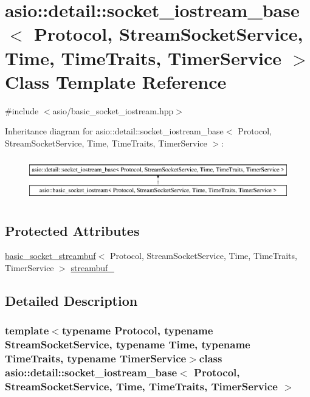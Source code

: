 \hypertarget{classasio_1_1detail_1_1socket__iostream__base}{}\section{asio\+:\+:detail\+:\+:socket\+\_\+iostream\+\_\+base$<$ Protocol, Stream\+Socket\+Service, Time, Time\+Traits, Timer\+Service $>$ Class Template Reference}
\label{classasio_1_1detail_1_1socket__iostream__base}


{\ttfamily \#include $<$asio/basic\+\_\+socket\+\_\+iostream.\+hpp$>$}

Inheritance diagram for asio\+:\+:detail\+:\+:socket\+\_\+iostream\+\_\+base$<$ Protocol, Stream\+Socket\+Service, Time, Time\+Traits, Timer\+Service $>$\+:\begin{figure}[H]
\begin{center}
\leavevmode
\includegraphics[height=1.882353cm]{classasio_1_1detail_1_1socket__iostream__base}
\end{center}
\end{figure}
\subsection*{Protected Attributes}
\begin{DoxyCompactItemize}
\item 
\hyperlink{classasio_1_1basic__socket__streambuf}{basic\+\_\+socket\+\_\+streambuf}$<$ Protocol, Stream\+Socket\+Service, Time, Time\+Traits, Timer\+Service $>$ \hyperlink{classasio_1_1detail_1_1socket__iostream__base_ac5d4983a9fb3035497092a1de10616d6}{streambuf\+\_\+}
\end{DoxyCompactItemize}


\subsection{Detailed Description}
\subsubsection*{template$<$typename Protocol, typename Stream\+Socket\+Service, typename Time, typename Time\+Traits, typename Timer\+Service$>$class asio\+::detail\+::socket\+\_\+iostream\+\_\+base$<$ Protocol, Stream\+Socket\+Service, Time, Time\+Traits, Timer\+Service $>$}



